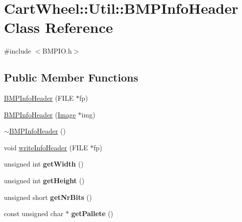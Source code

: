 \hypertarget{classCartWheel_1_1Util_1_1BMPInfoHeader}{
\section{CartWheel::Util::BMPInfoHeader Class Reference}
\label{classCartWheel_1_1Util_1_1BMPInfoHeader}
}


{\ttfamily \#include $<$BMPIO.h$>$}

\subsection*{Public Member Functions}
\begin{DoxyCompactItemize}
\item 
\hyperlink{classCartWheel_1_1Util_1_1BMPInfoHeader_a442b6897863ef05ef133ea563144aa55}{BMPInfoHeader} (FILE $\ast$fp)
\item 
\hyperlink{classCartWheel_1_1Util_1_1BMPInfoHeader_a6549427b2fc503fd9823db3b3fbee3ec}{BMPInfoHeader} (\hyperlink{classCartWheel_1_1Util_1_1Image}{Image} $\ast$img)
\item 
\hyperlink{classCartWheel_1_1Util_1_1BMPInfoHeader_afe2a51a77fcfd050a6d66f367976e603}{$\sim$BMPInfoHeader} ()
\item 
void \hyperlink{classCartWheel_1_1Util_1_1BMPInfoHeader_a2d77b91a2fd407fb33c2a87dd8f47857}{writeInfoHeader} (FILE $\ast$fp)
\item 
\hypertarget{classCartWheel_1_1Util_1_1BMPInfoHeader_a58a20711a09ce1bf5239864495f60389}{
unsigned int {\bfseries getWidth} ()}
\label{classCartWheel_1_1Util_1_1BMPInfoHeader_a58a20711a09ce1bf5239864495f60389}

\item 
\hypertarget{classCartWheel_1_1Util_1_1BMPInfoHeader_a16d92522243210678b0d06f5f39cbddf}{
unsigned int {\bfseries getHeight} ()}
\label{classCartWheel_1_1Util_1_1BMPInfoHeader_a16d92522243210678b0d06f5f39cbddf}

\item 
\hypertarget{classCartWheel_1_1Util_1_1BMPInfoHeader_aa5f41e56156b6f8e8260333d2e750d45}{
unsigned short {\bfseries getNrBits} ()}
\label{classCartWheel_1_1Util_1_1BMPInfoHeader_aa5f41e56156b6f8e8260333d2e750d45}

\item 
\hypertarget{classCartWheel_1_1Util_1_1BMPInfoHeader_a538f2d51637050410983efbe78ea3415}{
const unsigned char $\ast$ {\bfseries getPallete} ()}
\label{classCartWheel_1_1Util_1_1BMPInfoHeader_a538f2d51637050410983efbe78ea3415}

\end{DoxyCompactItemize}


